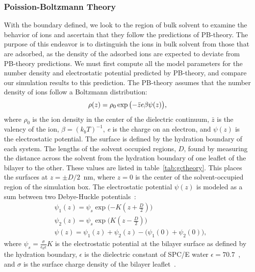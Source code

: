 \documentclass[journal=langd5,manuscript=article]{achemso}
\begin{document}
\subsubsection{Poission-Boltzmann Theory}
With the boundary defined, we look to the region of bulk solvent to examine the behavior of ions and ascertain that
they follow the predictions of PB-theory\cite{israelachvili:2011:intermol}. 
The purpose of this endeavor is to distinguish the ions in bulk solvent from those that are adsorbed,
as the density of the adsorbed ions are expected to deviate from PB-theory predictions.
We must first compute all the model parameters for the number density and electrostatic potential predicted by
PB-theory, and compare our simulation results to this prediction.
The PB-theory assumes 
that the number density of ions follow a Boltzmann distribution:
\begin{equation}
    \rho(z) = \rho_0 \exp\big({- \bar z \text{\si{\elementarycharge}} \beta \psi(z)}\big)\text{,}
    \label{eq:gcnum}
\end{equation}
where $\rho_0$ is the ion density in the center of the dielectric continuum, $\bar z$ is the valency of the ion, 
$\beta = (k_bT)^{-1}$, \si{\elementarycharge} is the charge
on an electron, and $\psi(z)$ is the electrostatic potential. The surface is defined by the hydration boundary of each system. 
The lengths of the solvent occupied regions, $D$,  found by measuring the distance across the solvent from the 
hydration boundary of one leaflet of the bilayer to the other. 
These values are listed in table~\ref{tab:gctheory}.
This places the surfaces at $z=\pm D/2$~nm, where $z=0$ is the center of the solvent-occupied region of the simulation box.
The electrostatic potential $\psi(z)$ is modeled as a sum between two Debye-Huckle potentials~\cite{israelachvili:2011:intermol}:
\begin{align}
    &\psi_{1}(z) = \psi_s \exp\bigg({-K(z+\frac{D}{2})}\bigg)\\
    &\psi_{2}(z) = \psi_s \exp\bigg({K(z-\frac{D}{2})}\bigg)\\
    \label{eq:gcpot}
    &\psi(z) = \psi_1(z) + \psi_2(z) - \big({\psi_1(0)+\psi_2(0)}\big)\text{,}
\end{align}
where $\psi_s = \frac{\sigma}{\epsilon_0\epsilon} K$ is the electrostatic potential at the bilayer surface
as defined by the hydration boundary, $\epsilon$ 
is the dielectric constant of SPC/E water $\epsilon=70.7$~\cite{reddy:1989:dielectric}, and $\sigma$
is the surface charge density of the bilayer leaflet~\cite{israelachvili:2011:intermol}. 
\end{document}
